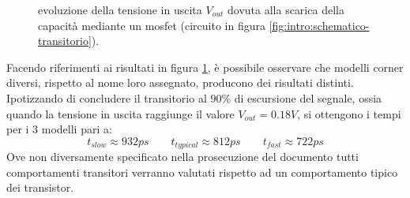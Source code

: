		\begin{figure}[bht]
			\centering
			
			\caption{evoluzione della tensione in uscita $V_{out}$ dovuta alla scarica della capacità mediante un mosfet (circuito in figura \ref{fig:intro:schematico-transitorio}).}
			\label{fig:intro:nmos-tempitransitorio}
		\end{figure}
	
		Facendo riferimenti ai risultati in figura \ref{fig:intro:nmos-tempitransitorio}, è possibile osservare che modelli corner diversi, rispetto al nome loro assegnato, producono dei risultati distinti. Ipotizzando di concludere il transitorio al $90\%$ di escursione del segnale, ossia quando la tensione in uscita raggiunge il valore $V_{out} = 0.18V$, si ottengono i tempi per i 3 modelli pari a:
		\[ t_{slow} \approx 932ps \qquad t_{typical} \approx 812 ps \qquad t_{fast} \approx 722 ps    \] 
		Ove non diversamente specificato nella prosecuzione del documento tutti comportamenti transitori verranno valutati rispetto ad un comportamento tipico dei transistor.
		
	
	
	
	
	
	
	